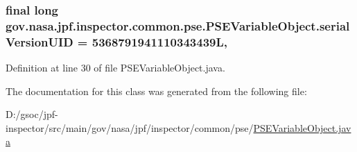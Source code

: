 \subsubsection[{\texorpdfstring{serial\+Version\+U\+ID}{serialVersionUID}}]{\setlength{\rightskip}{0pt plus 5cm}final long gov.\+nasa.\+jpf.\+inspector.\+common.\+pse.\+P\+S\+E\+Variable\+Object.\+serial\+Version\+U\+ID = 5368791941110343439L\hspace{0.3cm}{\ttfamily [static]}, {\ttfamily [private]}}\hypertarget{classgov_1_1nasa_1_1jpf_1_1inspector_1_1common_1_1pse_1_1_p_s_e_variable_object_ae3574b2566d01837e783e2afe0469671}{}\label{classgov_1_1nasa_1_1jpf_1_1inspector_1_1common_1_1pse_1_1_p_s_e_variable_object_ae3574b2566d01837e783e2afe0469671}


Definition at line 30 of file P\+S\+E\+Variable\+Object.\+java.



The documentation for this class was generated from the following file\+:\begin{DoxyCompactItemize}
\item 
D\+:/gsoc/jpf-\/inspector/src/main/gov/nasa/jpf/inspector/common/pse/\hyperlink{_p_s_e_variable_object_8java}{P\+S\+E\+Variable\+Object.\+java}\end{DoxyCompactItemize}
